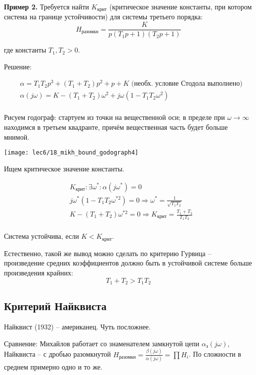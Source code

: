 \documentclass[main.tex]{subfiles}
\begin{document}
\textbf{Пример 2.} Требуется найти $ K_{\text{крит}} $ (критическое значение константы, при котором система на границе устойчивости) для системы третьего порядка:
$$ H_{\text{разомкн}} = \frac{K}{p(T_1 p + 1)(T_2 p + 1)} $$

где константы $ T_1, T_2 > 0 $.

Решение:

\begin{align*}
	& \alpha = T_1 T_2 p^3 + (T_1 + T_2) p^2 + p + K \text{ (необх. условие Стодола выполнено)} \\
    & \alpha(j \omega) = K - (T_1 + T_2) \omega^2 + j \omega (1 - T_1 T_2 \omega^2) \\
\end{align*}

Рисуем годограф: стартуем из точки на вещественной оси; в пределе при $ \omega \to \infty $ находимся в третьем квадранте, причём вещественная часть будет больше мнимой.

\texttt{[image: lec6/18\_mikh\_bound\_godograph4]}

Ищем критическое значение константы.

\begin{align*}
    & K_{\text{крит}} : \exists \omega^* : \alpha(j \omega^*) = 0 \\
    & j \omega^* (1 - T_1 T_2 \omega^{*2}) = 0 \Rightarrow \omega^* = \frac{1}{\sqrt{T_1 T_2}} \\
    & K - (T_1 + T_2) \omega^{*2} = 0 \Rightarrow K_{\text{крит}} = \frac{T_1 + T_2}{T_1 T_2} \\
\end{align*}

Система устойчива, если $ K < K_{\text{крит}} $.

Естественно, такой же вывод можно сделать по критерию Гурвица -- произведение средних коэффициентов должно быть в устойчивой системе больше произведения крайних:
$$ T_1 + T_2 > T_1 T_2 $$

\subsection{Критерий Найквиста}
Найквист (1932) -- американец.
Чуть посложнее.

Сравнение: Михайлов работает со знаменателем замкнутой цепи $ \alpha_{\text{з}}(j \omega) $, Найквиста -- с дробью разомкнутой $ H_{\text{разомкн}} = \frac{\beta(j \omega)}{\alpha(j \omega)} = \prod H_i $.
По сложности в среднем примерно одно и то же.
\end{document}
